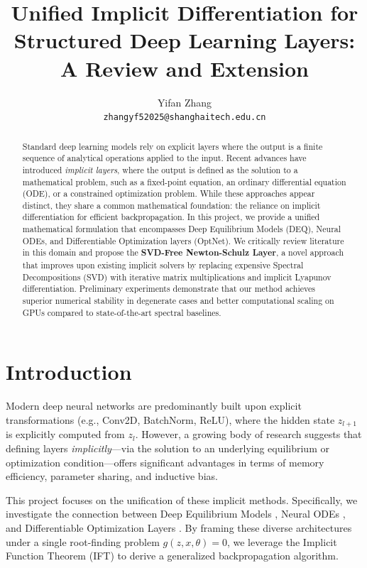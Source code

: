 \documentclass{article}
\title{Unified Implicit Differentiation for Structured Deep Learning Layers: A Review and Extension}
\author{
  Yifan Zhang \\
  \texttt{zhangyf52025@shanghaitech.edu.cn} \\
}
\date{}
\begin{document}
\maketitle

\begin{abstract}
  Standard deep learning models rely on explicit layers where the output is a finite sequence of analytical operations applied to the input. Recent advances have introduced \textit{implicit layers}, where the output is defined as the solution to a mathematical problem, such as a fixed-point equation, an ordinary differential equation (ODE), or a constrained optimization problem. While these approaches appear distinct, they share a common mathematical foundation: the reliance on implicit differentiation for efficient backpropagation. In this project, we provide a unified mathematical formulation that encompasses Deep Equilibrium Models (DEQ), Neural ODEs, and Differentiable Optimization layers (OptNet). We critically review literature in this domain and propose the \textbf{SVD-Free Newton-Schulz Layer}, a novel approach that improves upon existing implicit solvers by replacing expensive Spectral Decompositions (SVD) with iterative matrix multiplications and implicit Lyapunov differentiation. Preliminary experiments demonstrate that our method achieves superior numerical stability in degenerate cases and better computational scaling on GPUs compared to state-of-the-art spectral baselines.
\end{abstract}

\section{Introduction}
Modern deep neural networks are predominantly built upon explicit transformations (e.g., Conv2D, BatchNorm, ReLU), where the hidden state $z_{l+1}$ is explicitly computed from $z_l$. However, a growing body of research suggests that defining layers \textit{implicitly}---via the solution to an underlying equilibrium or optimization condition---offers significant advantages in terms of memory efficiency, parameter sharing, and inductive bias.

This project focuses on the unification of these implicit methods. Specifically, we investigate the connection between Deep Equilibrium Models \cite{bai2019deq}, Neural ODEs \cite{chen2018neuralode}, and Differentiable Optimization Layers \cite{amos2017optnet, agrawal2019differentiable}. By framing these diverse architectures under a single root-finding problem $g(z, x, \theta) = 0$, we leverage the Implicit Function Theorem (IFT) to derive a generalized backpropagation algorithm.
\end{document}
